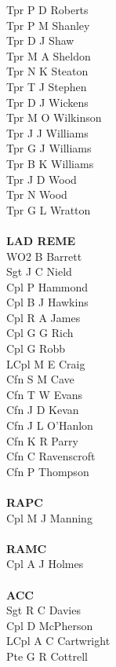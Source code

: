 \begin{multicols}{2}
  Tpr P D Roberts \\
  Tpr P M Shanley \\
  Tpr D J Shaw \\
  Tpr M A Sheldon \\
  Tpr N K Steaton \\
  Tpr T J Stephen \\
  Tpr D J Wickens \\
  Tpr M O Wilkinson \\
  Tpr J J Williams \\
  Tpr G J Williams \\
  Tpr B K Williams \\
  Tpr J D Wood \\
  Tpr N Wood \\
  Tpr G L Wratton \\
  \\
  \textbf{LAD REME} \\
  WO2 B Barrett \\
  Sgt J C Nield \\
  Cpl P Hammond \\
  Cpl B J Hawkins \\
  Cpl R A James \\
  Cpl G G Rich \\
  Cpl G Robb \\
  LCpl M E Craig \\
  Cfn S M Cave \\
  Cfn T W Evans \\
  Cfn J D Kevan \\
  Cfn J L O'Hanlon \\
  Cfn K R Parry \\
  Cfn C Ravenscroft \\
  Cfn P Thompson \\
  \\
  \textbf{RAPC} \\
  Cpl M J Manning \\
  \\
  \textbf{RAMC} \\
  Cpl A J Holmes \\
  \\
  \textbf{ACC} \\
  Sgt R C Davies \\
  Cpl D McPherson \\
  LCpl A C Cartwright \\
  Pte G R Cottrell \\
\end{multicols}
